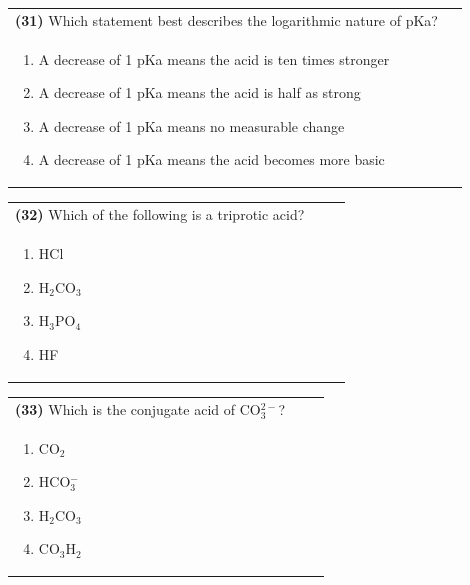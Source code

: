 \documentclass{article}
\begin{document}
\noindent\begin{tabular}{|p{0.9\linewidth}|}
\hline
\textbf{(31)} Which statement best describes the logarithmic nature of pKa? \\[0.2cm]
\begin{minipage}{0.85\linewidth}
\begin{enumerate}[label=\alph*.]
\item A decrease of 1 pKa means the acid is ten times stronger
\item A decrease of 1 pKa means the acid is half as strong
\item A decrease of 1 pKa means no measurable change
\item A decrease of 1 pKa means the acid becomes more basic
\end{enumerate}
\end{minipage}\\[0.2cm]
\hline
\end{tabular}

\noindent\begin{tabular}{|p{0.9\linewidth}|}
\hline
\textbf{(32)} Which of the following is a triprotic acid? \\[0.2cm]
\begin{minipage}{0.85\linewidth}
\begin{enumerate}[label=\alph*.]
\item HCl \item H$_2$CO$_3$ \item H$_3$PO$_4$ \item HF
\end{enumerate}
\end{minipage}\\[0.2cm]
\hline
\end{tabular}
\newpage

\noindent\begin{tabular}{|p{0.9\linewidth}|}
\hline
\textbf{(33)} Which is the conjugate acid of CO$_3^{2-}$? \\[0.2cm]
\begin{minipage}{0.85\linewidth}
\begin{enumerate}[label=\alph*.]
\item CO$_2$ \item HCO$_3^-$ \item H$_2$CO$_3$ \item CO$_3$H$_2$
\end{enumerate}
\end{minipage}\\[0.2cm]
\hline
\end{tabular}
\end{document}
